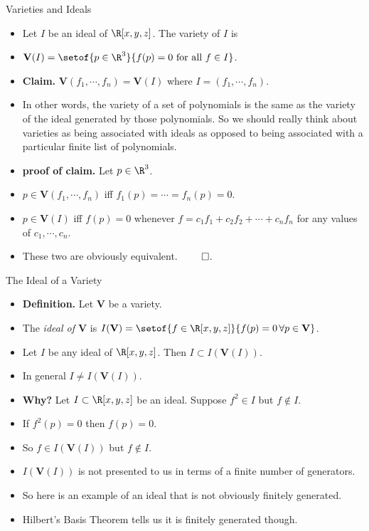 \documentclass{beamer}
\begin{document}

\begin{frame}{Varieties and Ideals}

\begin{itemize}
  \item Let $I$ be an ideal of $\R[x,y,z]$. The variety of $I$ is
  \item $\mathbf{V}(I) = \setof{p\in\R^3}{f(p)=0\text{ for all } f\in I}$.
  \item \textbf{Claim.} $\mathbf{V}(f_1,\cdots,f_n) = \mathbf{V}(I)$ where $I = (f_1,\cdots,f_n)$.
  \item In other words, the variety of a set of polynomials is the same as the variety of the ideal generated by those polynomials.
  So we should really think about varieties as being associated with ideals as opposed to being associated with a particular finite list of polynomials.
  \item \textbf{proof of claim.} Let $p\in\R^3$.
  \item $p\in \mathbf{V}(f_1,\cdots,f_n)$ iff $f_1(p) = \cdots = f_n(p) = 0$.
  \item $p\in \mathbf{V}(I)$ iff $f(p)=0$ whenever $f=c_1f_1 + c_2f_2 + \cdots + c_nf_n$ for any values of $c_1,\cdots,c_n$.
  \item These two are obviously equivalent. $\qed$.
\end{itemize}
\end{frame}



\begin{frame}{The Ideal of a Variety}

\begin{itemize}
  \item \textbf{Definition.} Let $\mathbf{V}$ be a variety.
  \item The \emph{ideal of  $\mathbf{V}$} is $I(\mathbf{V}) = \setof{f\in\R[x,y,z]}{f(p) = 0 \, \forall p \in \mathbf{V}}$.
  \item Let $I$ be any ideal of $\R[x,y,z]$. Then $I\subset I(\mathbf{V}(I))$.
  \item In general $I\not= I(\mathbf{V}(I))$.
  \item \textbf{Why?} Let $I\subset\R[x,y,z]$ be an ideal. Suppose $f^2\in I$ but $f\not\in I$.
  \item If $f^2(p)=0$ then $f(p)=0$.
  \item So $f\in I(\mathbf{V}(I))$ but $f\notin I$.
  \item $I(\mathbf{V}(I))$ is not presented to us in terms of a finite number of generators.
  \item So here is an example of an ideal that is not obviously finitely generated.
  \item Hilbert's Basis Theorem tells us it is finitely generated though.
\end{itemize}
\end{frame}
\end{document}
